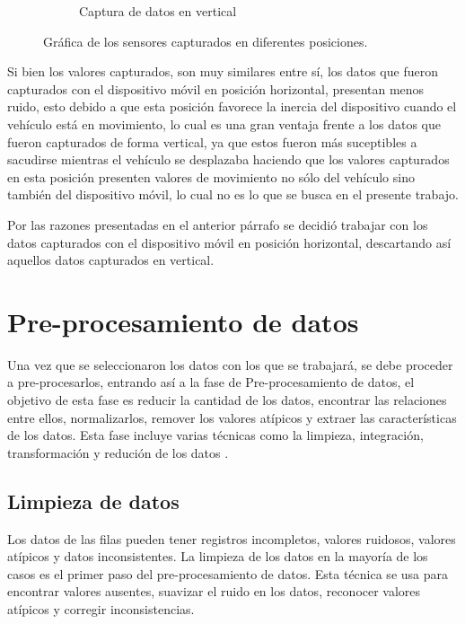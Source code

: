 \begin{figure}
\begin{subfigure}[h]{0.47\textwidth}
            \caption{Captura de datos en vertical}
            \label{fig:ver}
        \end{subfigure}
        \caption{Gr\'{a}fica de los sensores capturados en diferentes posiciones.}
        		\label{fig:verHor}
    \end{figure}

\vspace{5mm} %

Si bien los valores capturados, son muy similares entre s\'{i}, los datos que fueron capturados con el dispositivo m\'{o}vil en posici\'{o}n horizontal, presentan menos ruido, esto debido a que esta posici\'{o}n favorece la inercia del dispositivo cuando el veh\'{i}culo est\'{a} en movimiento, lo cual es una gran ventaja frente a los datos que fueron capturados de forma vertical, ya que estos fueron m\'{a}s suceptibles a sacudirse mientras el veh\'{i}culo se desplazaba haciendo que los valores capturados en esta posici\'{o}n presenten valores de movimiento no s\'{o}lo del veh\'{i}culo sino tambi\'{e}n del dispositivo m\'{o}vil, lo cual no es lo que se busca en el presente trabajo.

\vspace{5mm} %

Por las razones presentadas en el anterior p\'{a}rrafo se decidi\'{o} trabajar con los datos capturados con el dispositivo m\'{o}vil en posici\'{o}n horizontal, descartando as\'{i} aquellos datos capturados en vertical.

\section{Pre-procesamiento de datos}

Una vez que se seleccionaron los datos con los que se trabajar\'{a}, se debe proceder a pre-procesarlos, entrando as\'{i} a la fase de Pre-procesamiento de datos, el objetivo de esta fase es reducir la cantidad de los datos, encontrar las relaciones entre ellos, normalizarlos, remover los valores at\'{i}picos y extraer las caracter\'{i}sticas de los datos. Esta fase incluye varias t\'{e}cnicas como la limpieza, integraci\'{o}n, transformaci\'{o}n y reduci\'{o}n de los datos \cite{38}.

\subsection{Limpieza de datos}

Los datos de las filas pueden tener registros incompletos, valores ruidosos, valores at\'{i}picos y datos inconsistentes. La limpieza de los datos en la mayor\'{i}a de los casos es el primer paso del pre-procesamiento de datos. Esta t\'{e}cnica se usa para encontrar valores ausentes, suavizar el ruido en los datos, reconocer valores at\'{i}picos y corregir inconsistencias.

